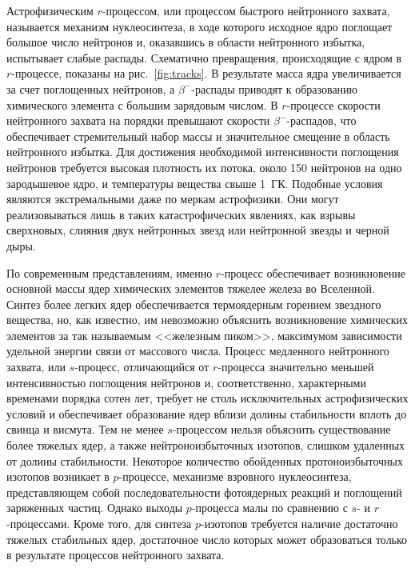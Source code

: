 Астрофизическим $r$-процессом, или процессом быстрого нейтронного захвата, называется механизм нуклеосинтеза, в ходе которого исходное ядро поглощает большое число нейтронов и, оказавшись в области нейтронного избытка, испытывает слабые распады. Схематично превращения, происходящие с ядром в $r$-процессе, показаны на рис.~\ref{fig:tracks}. В результате масса ядра увеличивается за счет поглощенных нейтронов, а $\beta^-$-распады приводят к образованию химического элемента с большим зарядовым числом. В $r$-процессе скорости нейтронного захвата на порядки превышают скорости $\beta^-$-распадов, что обеспечивает стремительный набор массы и значительное смещение в область нейтронного избытка. Для достижения необходимой интенсивности поглощения нейтронов требуется высокая плотность их потока, около 150 нейтронов на одно зародышевое ядро, и температуры вещества свыше 1~ГК. Подобные условия являются экстремальными даже по меркам астрофизики. Они могут реализовываться лишь в таких катастрофических явлениях, как взрывы сверхновых, слияния двух нейтронных звезд или нейтронной звезды и черной дыры.

По современным представлениям, именно $r$-процесс обеспечивает возникновение основной массы ядер химических элементов тяжелее железа во Вселенной. Синтез более легких ядер обеспечивается термоядерным горением звездного вещества, но, как известно, им невозможно объяснить возникновение химических элементов за так называемым <<железным пиком>>, максимумом зависимости удельной энергии связи от массового числа. Процесс медленного нейтронного захвата, или $s$-процесс, отличающийся от $r$-процесса значительно меньшей интенсивностью поглощения нейтронов и, соответственно, характерными временами порядка сотен лет, требует не столь исключительных астрофизических условий и обеспечивает образование ядер вблизи долины стабильности вплоть до свинца и висмута. Тем не менее $s$-процессом нельзя объяснить существование более тяжелых ядер, а также нейтроноизбыточных изотопов, слишком удаленных от долины стабильности. Некоторое количество обойденных протоноизбыточных изотопов возникает в $p$-процессе, механизме взровного нуклеосинтеза, представляющем собой последовательности фотоядерных реакций и поглощений заряженных частиц. Однако выходы $p$-процесса малы по сравнению с $s$- и $r$-процессами. Кроме того, для синтеза $p$-изотопов требуется наличие достаточно тяжелых стабильных ядер, достаточное число которых может образоваться только в результате процессов нейтронного захвата. 

